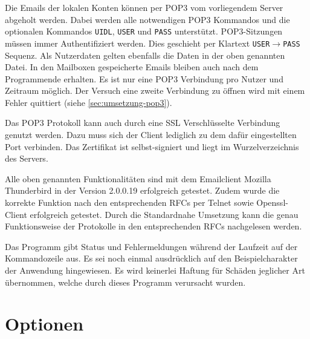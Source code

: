 \documentclass[final,a4paper,11pt,notitlepage,halfparskip]{scrreprt}
\begin{document}
Die Emails der lokalen Konten können per POP3 vom vorliegendem Server abgeholt
werden. Dabei werden alle notwendigen POP3 Kommandos und die optionalen
Kommandos \texttt{UIDL}, \texttt{USER} und \texttt{PASS} unterstützt.
POP3-Sitzungen müssen immer Authentifiziert werden. Dies geschieht per Klartext
\texttt{USER}$\rightarrow$\texttt{PASS} Sequenz. Als Nutzerdaten gelten ebenfalls
die Daten in der oben genannten Datei. In den Mailboxen gespeicherte Emails
bleiben auch nach dem Programmende erhalten. Es ist nur eine POP3 Verbindung pro
Nutzer und Zeitraum möglich. Der Versuch eine zweite Verbindung zu öffnen wird
mit einem Fehler quittiert (siehe \ref{sec:umsetzung-pop3}).

Das POP3 Protokoll kann auch durch eine SSL Verschlüsselte Verbindung genutzt
werden. Dazu muss sich der Client lediglich zu dem dafür eingestellten Port
verbinden. Das Zertifikat ist selbst-signiert und liegt im Wurzelverzeichnis des
Servers.

Alle oben genannten Funktionalitäten sind mit dem Emailclient Mozilla
Thunderbird in der Version 2.0.0.19 erfolgreich getestet. Zudem wurde die
korrekte Funktion nach den entsprechenden RFCs per Telnet sowie Openssl-Client
erfolgreich getestet. Durch die Standardnahe Umsetzung kann die genau
Funktionsweise der Protokolle in den entsprechenden RFCs nachgelesen werden.

Das Programm gibt Status und Fehlermeldungen während der Laufzeit auf der
Kommandozeile aus. Es sei noch einmal ausdrücklich auf den Beispielcharakter der
Anwendung hingewiesen. Es wird keinerlei Haftung für Schäden jeglicher Art
übernommen, welche durch dieses Programm verursacht wurden.


\section{Optionen}




\pagebreak
\end{document}
